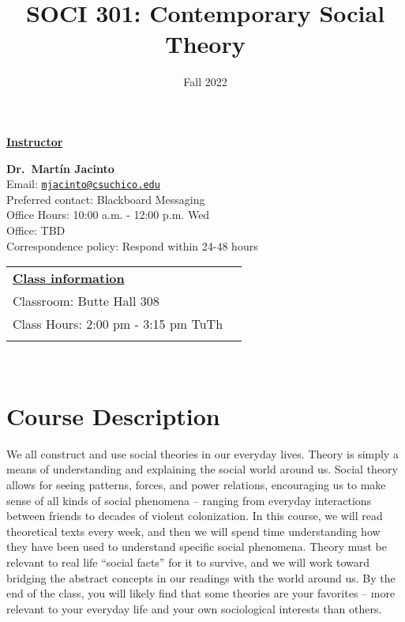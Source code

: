 \documentclass[11pt,]{article}
\title{SOCI 301: Contemporary Social Theory}
\date{Fall 2022}
\begin{document}
  

		\maketitle
		
	
		\thispagestyle{firststyle}

\textbf{\underline{Instructor}}
\begin{multicols}{2}

  \textbf{Dr.~Martín Jacinto}\\
  Email: \href{mailto:mjacinto@csuchico.edu}{\nolinkurl{mjacinto@csuchico.edu}}\\
  Preferred contact: Blackboard Messaging\\
  Office Hours: 10:00 a.m. - 12:00 p.m. Wed\\
  Office: TBD\\
  Correspondence policy: Respond within 24-48 hours\\
    \columnbreak
    
  \end{multicols}
	
\noindent \begin{tabular*}{\textwidth}{ @{\extracolsep{\fill}} lr @{\extracolsep{\fill}}}
\textbf{\underline{Class information}}\\
  Classroom: Butte Hall 308\\
  Class Hours: 2:00 pm - 3:15 pm TuTh\\
    \\
	\end{tabular*}\\


\vspace{2mm}


\hypertarget{course-description}{%
\section{Course Description}\label{course-description}}

We all construct and use social theories in our everyday lives. Theory
is simply a means of understanding and explaining the social world
around us. Social theory allows for seeing patterns, forces, and power
relations, encouraging us to make sense of all kinds of social phenomena
-- ranging from everyday interactions between friends to decades of
violent colonization. In this course, we will read theoretical texts
every week, and then we will spend time understanding how they have been
used to understand specific social phenomena. Theory must be relevant to
real life ``social facts'' for it to survive, and we will work toward
bridging the abstract concepts in our readings with the world around us.
By the end of the class, you will likely find that some theories are
your favorites -- more relevant to your everyday life and your own
sociological interests than others.
\end{document}
